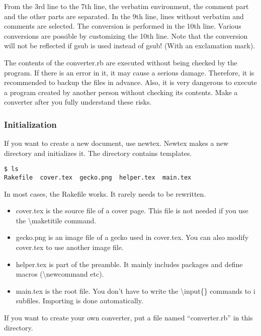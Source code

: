 \documentclass[
]{article}
\providecommand{\tightlist}{%
  \setlength{\itemsep}{0pt}\setlength{\parskip}{0pt}}
\begin{document}
From the 3rd line to the 7th line, the verbatim environment, the comment
part and the other parts are separated. In the 9th line, lines without
verbatim and comments are selected. The conversion is performed in the
10th line. Various conversions are possible by customizing the 10th
line. Note that the conversion will not be reflected if gsub is used
instead of gsub! (With an exclamation mark).

The contents of the converter.rb are executed without being checked by
the program. If there is an error in it, it may cause a serious damage.
Therefore, it is recommended to backup the files in advance. Also, it is
very dangerous to execute a program created by another person without
checking its contents. Make a converter after you fully understand these
risks.

\hypertarget{initialization}{%
\subsubsection{Initialization}\label{initialization}}

If you want to create a new document, use newtex. Newtex makes a new
directory and initializes it. The directory contains templates.

\begin{verbatim}
$ ls
Rakefile  cover.tex  gecko.png  helper.tex  main.tex
\end{verbatim}

In most cases, the Rakefile works. It rarely needs to be rewritten.

\begin{itemize}
\tightlist
\item
  cover.tex is the source file of a cover page. This file is not needed
  if you use the \textbackslash maketitile command.
\item
  gecko.png is an image file of a gecko used in cover.tex. You can also
  modify cover.tex to use another image file.
\item
  helper.tex is part of the preamble. It mainly includes packages and
  define macros (\textbackslash newcommand etc).
\item
  main.tex is the root file. You don't have to write the
  \textbackslash input\{\} commands to i subfiles. Importing is done
  automatically.
\end{itemize}

If you want to create your own converter, put a file named
``converter.rb'' in this directory.
\end{document}
